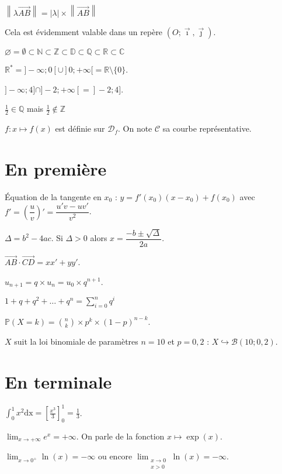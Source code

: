 \documentclass[10pt,french]{article}
\begin{document}
$\left\lVert \lambda \overrightarrow{AB}\right\rVert =
\left\lvert \lambda \right\rvert \times \left\lVert \overrightarrow{AB}\right\rVert$\par\medskip
Cela est évidemment valable dans un repère
$\left(O ; \overrightarrow\imath, \overrightarrow\jmath\right)$.\medskip

$\varnothing = \emptyset \subset \mathds N \subset \mathds Z \subset
\mathds D \subset \mathds Q\subset \mathds R \subset \mathds C$ \medskip

$\mathds R^*=]-\infty ; 0[ \cup ]0 ; +\infty[ = \mathds R \setminus \{0\}$.\medskip

$]-\infty ; 4] \cap ]-2 ; +\infty[ = ]-2 ; 4]$.\medskip

$\frac 1 2 \in \mathds Q$ mais $\frac 1 2 \notin \mathds Z$\medskip

$f\colon x \mapsto f(x)$ est définie sur $\mathcal D_f$.
On note $\mathcal C$ sa courbe représentative.

\section{En première}

\'Equation de la tangente en $x_0$ :
$y = f'(x_0) \left(x - x_0\right) + f(x_0)$ avec
$f' = \left(\dfrac u v\right)' = \dfrac{u'v - uv'}{v^2}$.\medskip

$\Delta = b^2 - 4ac$. Si $\Delta > 0$ alors
$x = \dfrac{-b \pm \sqrt \Delta}{2a}$.\medskip

$\overrightarrow{AB} \cdot \overrightarrow{CD} = xx' + yy'$.\medskip

$u_{n + 1} = q\times u_n = u_0 \times q^{n+1}$.\medskip

$1 + q + q^2 + \dots + q^n = \sum_{i = 0}^n q^i$\medskip

$\mathds P(X = k) = \binom n k \times p^k \times (1-p)^{n-k}$.\medskip

$X$ suit la loi binomiale de paramètres $n=10$ et $p=0,2$ :
$X \hookrightarrow \mathcal B(10 ; 0,2)$.

\section{En terminale}

$\int_0^1 x^2 \mathrm{dx} = \left[\frac{x^3}{3}\right]_0^1 = \frac 13$.\medskip

$\lim_{x \to +\infty} e^x= +\infty$. On parle de la fonction $x \mapsto \exp(x)$.\medskip

$\lim_{x \to 0^+}\ln(x) = -\infty$ ou encore $\lim_{\substack{x \to 0 \\ x > 0}}\ln(x) = -\infty$.\medskip
\end{document}

